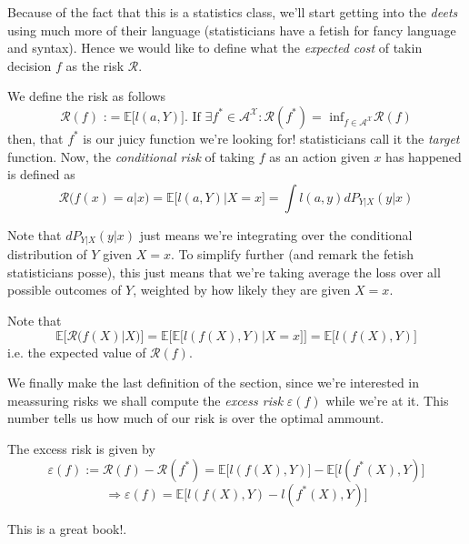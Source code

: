 Because of the fact that this is a statistics class, we'll start getting into the \textit{deets} using much more of their language (statisticians have a fetish for fancy language and syntax). Hence we would like to define what the \textit{expected cost} of takin decision $f$ as the risk $\mathcal{R}$.

\begin{definition}
    We define the risk as follows $$\mathcal{R}(f) \text{ :}= \mathbb{E}\big[l(a,Y) \big] \text{. If  } \exists f^* \in \mathcal{A}^{\mathcal{X}} : \mathcal{R}(f^*)=\text{ inf}_{f \in \mathcal{A}^{\mathcal{X}}} \mathcal{R}(f)$$ then, that $f^*$ is our juicy function we're looking for! statisticians call it the
    \textit{target} function. Now, the \textit{conditional risk} of taking $f$ as an action given $x$ has happened is defined as $$\mathcal{R}(f(x)=a|x) = \mathbb{E}\big[l(a,Y) | X = x \big] = \int l(a,y) dP_{Y|X}(y|x)$$ 
\end{definition}

Note that $dP_{Y|X}(y|x)$ just means we're integrating over the conditional distribution of $Y$ given $X=x$. To simplify further (and remark the fetish statisticians posse), this just means that we're taking average the loss over all possible outcomes of $Y$, weighted by how likely they are given $X=x$.

\begin{remark}
    Note that $$\mathbb{E}\big[ \mathcal{R}(f(X)|X) \big] = \mathbb{E}\big[ \mathbb{E}\big[l(f(X),Y) | X = x \big]\big]=\mathbb{E} \big[l(f(X),Y)\big]$$ i.e. the expected value of $\mathcal{R}(f)$.
\end{remark}

We finally make the last definition of the section, since we're interested in meassuring risks we shall compute the \textit{excess risk} $\varepsilon(f)$ while we're at it. This number tells us how much of our risk is over the optimal ammount.

\begin{definition}
    The excess risk is given by $$\varepsilon (f) := \mathcal{R}(f) - \mathcal{R}(f^*) = \mathbb{E} \big[l(f(X),Y)\big] - \mathbb{E} \big[l(f^*(X),Y)\big]$$ $$\Rightarrow \varepsilon (f) = \mathbb{E} \big[l(f(X),Y) - l(f^*(X),Y)\big]$$
\end{definition}

This is a great book!\cite{judson2019abstract}.